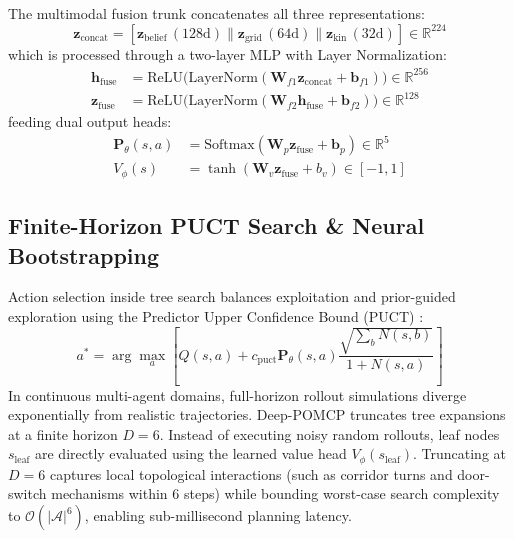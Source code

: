\documentclass[conference]{IEEEtran}
\begin{document}
The multimodal fusion trunk concatenates all three representations:
\begin{equation}
    \mathbf{z}_{\text{concat}} = [\mathbf{z}_{\text{belief}} \,(128\text{d}) \parallel \mathbf{z}_{\text{grid}} \,(64\text{d}) \parallel \mathbf{z}_{\text{kin}} \,(32\text{d})] \in \mathbb{R}^{224}
\end{equation}
which is processed through a two-layer MLP with Layer Normalization:
\begin{align}
    \mathbf{h}_{\text{fuse}} &= \text{ReLU}\big(\text{LayerNorm}(\mathbf{W}_{f1} \mathbf{z}_{\text{concat}} + \mathbf{b}_{f1})\big) \in \mathbb{R}^{256} \\
    \mathbf{z}_{\text{fuse}} &= \text{ReLU}\big(\text{LayerNorm}(\mathbf{W}_{f2} \mathbf{h}_{\text{fuse}} + \mathbf{b}_{f2})\big) \in \mathbb{R}^{128}
\end{align}
feeding dual output heads:
\begin{align}
    \mathbf{P}_\theta(s, a) &= \text{Softmax}(\mathbf{W}_p \mathbf{z}_{\text{fuse}} + \mathbf{b}_p) \in \mathbb{R}^5 \\
    V_\phi(s) &= \tanh(\mathbf{W}_v \mathbf{z}_{\text{fuse}} + b_v) \in [-1, 1]
\end{align}

\subsection{Finite-Horizon PUCT Search \& Neural Bootstrapping}
Action selection inside tree search balances exploitation and prior-guided exploration using the Predictor Upper Confidence Bound (PUCT) \cite{silver2017mastering}:
\begin{equation}
    a^* = \arg\max_{a} \left[ Q(s, a) + c_{\text{puct}} \mathbf{P}_\theta(s, a) \frac{\sqrt{\sum_b N(s, b)}}{1 + N(s, a)} \right]
    \label{eq:puct}
\end{equation}
In continuous multi-agent domains, full-horizon rollout simulations diverge exponentially from realistic trajectories. Deep-POMCP truncates tree expansions at a finite horizon $D = 6$. Instead of executing noisy random rollouts, leaf nodes $s_{\text{leaf}}$ are directly evaluated using the learned value head $V_\phi(s_{\text{leaf}})$. Truncating at $D=6$ captures local topological interactions (such as corridor turns and door-switch mechanisms within 6 steps) while bounding worst-case search complexity to $\mathcal{O}(|\mathcal{A}|^6)$, enabling sub-millisecond planning latency.
\end{document}
